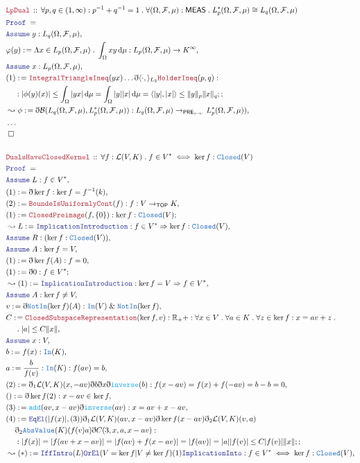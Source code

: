 \documentclass[12pt]{scrartcl}
\newcommand{\TYPE}[1]{\textcolor{NavyBlue}{\mathtt{#1}}}
\newcommand{\FUNC}[1]{\textcolor{Cerulean}{\mathtt{#1}}}
\newcommand{\LOGIC}[1]{\textcolor{Blue}{\mathtt{#1}}}
\newcommand{\THM}[1]{\textcolor{Maroon}{\mathtt{#1}}}
\renewcommand{\.}{\; . \;}
\newcommand{\de}{: \kern 0.1pc =}
\newcommand{\Theorem}[2]{& \THM{#1} \, :: \, #2 \\ & \Proof = \\ }
\newcommand{\NewLine}{\\ & \kern 1pc}
\newcommand{\Page}[1]{\begin{align*} #1 \end{align*} \newpage   }
\newcommand{ \bd }{ \ByDef }
\newcommand{\NoProof}{ & \ldots \\ \EndProof}
\renewcommand{\And}{\; \& \;}
\newcommand{\Reals}{\mathbb{R} }
\newcommand{\Say}[3]{& #1 \de #2 : #3, \\}
\newcommand{\Conclude}[3]{& #1 \de #2 : #3; \\}
\newcommand{\Derive}[3]{& \leadsto #1 \de #2 : #3, \\}
\newcommand{\A}{\LOGIC{Assume} \;}
\newcommand{\Assume}[2]{& \A #1 : #2, \\}
\newcommand{\QED}{\; \square}
\newcommand{\EndProof}{& \QED \\}
\newcommand{\ByDef}{\eth}
\newcommand{\Proof}{\LOGIC{Proof} \; }
\newcommand{\TOP}{\mathsf{TOP}}
\newcommand{\PREI}{\mathsf{PRE}_{\circ \to \cdot}} %
\newcommand{\MEAS}{\mathsf{MEAS}}
\newcommand{\F}{\mathcal{F}}
\renewcommand{\O}{\Omega}
\newcommand{\B}{\mathcal{B}}
\begin{document}
 \Page{
     \Theorem{LpDual}{ \forall p,q \in (1,\infty) : p^{-1} + q^{-1} = 1 \. \forall (\O,\F,\mu) : \MEAS \. L_p^*(\O,\F,\mu) \cong L_q(\O,\F,\mu)}
 \Assume{ y }{L_q(\O,\F,\mu)}
 \Say{ \varphi(y)}{ \Lambda x \in L_p(\O,\F,\mu) \. \int_\O  xy \, \mathrm{d}\mu  }
  { L_p(\O,\F,\mu) \to K^\infty   }
  \Assume{x}{L_p(\O,\F,\mu)}
  \Conclude{(1)}{ \THM{IntegralTriangleIneq}( yx ) \ldots \bd \langle \cdot, \rangle_{L_2}
  \THM{HolderIneq}(p,q) }
  {  \NewLine : 
   | \phi(y)(x) | \le  \int_\O | yx  |  \, \mathrm{d}\mu  =
     \int_\O | y | | x  |  \, \mathrm{d}\mu = \langle |y|, |x| \rangle \le 
     \|  y \|_p \| x \|_q ;
   }
   \Derive{\phi}{ \bd \B( L_q(\O,\F,\mu), L_p^*(\O,\F,\mu) )}{  L_q(\O,\F,\mu) \to_{\PREI} L_p^*(\O,\F,\mu) ) }
   \NoProof
   \\
   \Theorem{DualsHaveClosedKernel}{ \forall f : \mathcal{L}(V,K) \. f \in V^* \iff \ker f : \TYPE{Closed}(V) }
   \Assume{ L}{ f \in V^*}
   \Say{(1)}{\bd \ker f}{ \ker f = f^{-1}(k) }
   \Say{(2)}{ \THM{BoundeIsUniformlyCont}(f) }{f : V \to_{\TOP} K}
   \Conclude{ (1)}{\THM{ClosedPreimage}(f,\{0\}) }{ \ker f : \TYPE{Closed}(V) }
   \Derive{L}{ \LOGIC{ImplicationIntroduction}}{ f \in V^* \Rightarrow \ker f : \TYPE{Closed}(V)}
   \Assume{R}{(\ker f : \TYPE{Closed}(V))} 
   \Assume{A}{ \ker f = V}
   \Say{(1)}{\bd \ker f (A)}{f = 0}
   \Conclude{ (1)}{\bd 0 }{ f \in V^* }
   \Derive{(1)}{\LOGIC{ImplicationIntroduction}}{\ker f = V \Rightarrow f \in V^*}
   \Assume{A}{ \ker f \neq V}
   \Say{v}{ \bd \TYPE{NotIn}(\ker f)(A) }{\TYPE{In}(V) \And \TYPE{NotIn}(\ker f)}
   \Say{C}{\THM{ClosedSubspaceRepresentation}(\ker f, v)}{\Reals_++ : \forall x \in V \. \forall
    a \in K \. \forall z \in \ker f : x = av + z  \. \NewLine \. |a| \le C\| x \| }
   \Assume{x}{V}   
   \Say{b}{f(x)}{\TYPE{In}(K)}
   \Say{a}{ \frac{b}{f(v)}}{ \TYPE{In}(K) : f(av) = b }
   \Say{(2)}{ \bd_1 \mathcal{L}(V,K)(x,-av)\bd b \bd x \bd \FUNC{inverse}(b)}{ f(x - av) = f(x) + f( -av) = b - b = 0}
   \Say{()}{ \bd \ker f (2)}{ x - av \in \ker f }
   \Say{(3)}{\FUNC{add}(av,x - av)\bd\FUNC{inverse}(av)}{x = av + x - av}
   \Conclude{(4)}{ \LOGIC{EqEl}(|f(x)|, (3)) \bd_1 \mathcal{L}(V,K)(av,x - av)\bd \ker f(x - av) 
    \bd_2 \mathcal{L}(V,K)(v,a) 
    \NewLine    
    \bd_2 \TYPE{AbsValue}(K)( f(v)a)  \bd C (3, x,a,x - av) 
    }
   { \NewLine : |f(x)| = |f(av + x - av)| = | f(av) + f(x - av) | = |f(av)| = |a||f(v)| \le 
    C|f(v)|\| x \|  ;}
   \Derive{(*)}{\LOGIC{IffIntro}(L)\LOGIC{OrEl}(V = \ker f | V \neq \ker f)(1)\LOGIC{ImplicationInto}}{ f \in V^* \iff \ker f : \TYPE{Closed}(V) }
  }
\end{document}

